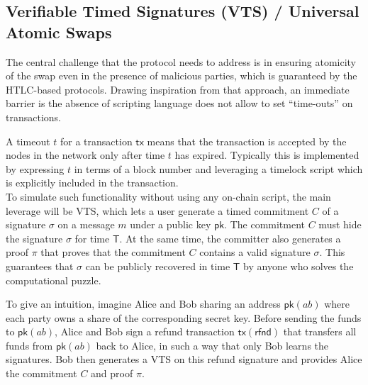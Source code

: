 \documentclass{article}      	%
\begin{document}
\subsection{Verifiable Timed Signatures (VTS) / Universal Atomic Swaps}
The central challenge that the protocol needs to address is in ensuring atomicity of the swap even in the presence of malicious parties, which is guaranteed by the HTLC-based protocols. Drawing inspiration from that approach, an immediate barrier is the absence of scripting language does not allow to set “time-outs” on transactions.

A timeout $t$ for a transaction $\mathsf{tx}$ means that the transaction is accepted by the nodes in the network only after time $t$ has expired. Typically this is implemented by expressing $t$ in terms of a block number and leveraging a timelock script which is explicitly included in the transaction. \\

To simulate  such functionality without using any on-chain script, the main leverage will be VTS, which lets a user generate a timed commitment $C$ of a signature $\sigma$ on a message $m$ under a public key $\mathsf{pk}$. The commitment $C $ must hide the signature $\sigma$ for time $\mathsf{T}$. At the same time, the committer also generates a proof $\pi$ that proves that the commitment $C$ contains a valid signature $\sigma$. This guarantees that $\sigma$ can be publicly recovered in time $\mathsf{T}$ by anyone who solves the computational puzzle.

To give an intuition, imagine Alice and Bob sharing an address $\mathsf{pk}(ab)$ where each party owns a share of the corresponding secret key.  Before sending the funds to $\mathsf{pk}(ab)$, Alice and Bob sign a refund transaction $\mathsf{tx}(\mathsf{rfnd})$ that transfers all funds from $\mathsf{pk}(ab)$ back to Alice, in such a way that only Bob learns the signatures. Bob then generates a VTS on this refund signature and provides Alice the commitment $C$ and proof $\pi$. \\
\end{document}
